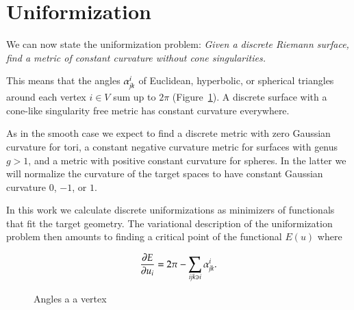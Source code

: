 \documentclass[Thesis.tex]{subfiles}
\begin{document}
\section{Uniformization}
We can now state the uniformization problem:
\emph{Given a discrete Riemann surface, find a metric of constant curvature
without cone singularities.}

This means that the angles $\alpha_{\it{jk}}^i$ of Euclidean, hyperbolic, or spherical triangles around each vertex  $i\in V$ sum up to $2\pi$ (Figure~\ref{fig:angles_at_vertex}). A discrete surface with a cone-like singularity free metric has constant curvature everywhere. 

As in the smooth case we expect to find a discrete metric with zero Gaussian curvature for tori, a constant negative curvature metric for surfaces with genus $g>1$, and a metric with positive constant curvature for spheres. In the latter we will normalize the curvature of the target spaces to have constant Gaussian curvature $0$, $-1$, or $1$. 

In this work we calculate discrete uniformizations as minimizers of functionals that fit the target geometry. The variational description of the uniformization problem then amounts to finding a critical point of the functional $E(u)$ where

\begin{equation}
\label{eq:gradient_variational}
\frac{\partial E}{\partial u_i} = 2\pi - \sum_{\it{ijk}\ni i} \alpha^i_{\it{jk}}.
\end{equation}  

\begin{figure}
\centering
\scalebox{0.4}{}
\caption[Angles at a vertex]{Angles a a vertex}
\label{fig:angles_at_vertex}
\end{figure}

\subfilebibliography
\end{document}
